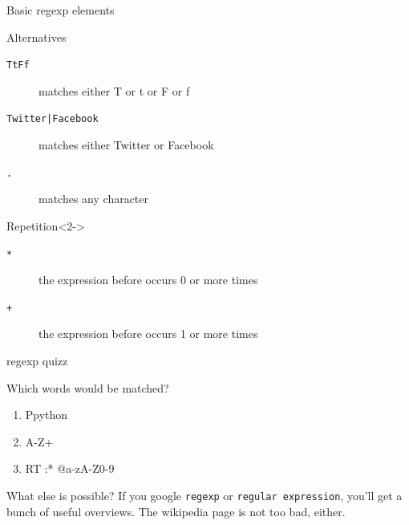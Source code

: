 \documentclass{beamer}
\begin{document}
\begin{frame}{Basic regexp elements}
\begin{block}{Alternatives}
\begin{description}
\item[{\tt{\lbrack TtFf\rbrack}}] matches either T or t or F or f
\item[{\tt{Twitter|Facebook}}] matches either Twitter or Facebook
\item[{\tt{.}}] matches any character
\end{description}
\end{block}
\begin{block}{Repetition}<2->
\begin{description}
\item[{\tt{*}}] the expression before occurs 0 or more times
\item[{\tt{+}}] the expression before occurs 1 or more times
\end{description}
\end{block}
\end{frame}

\begin{frame}{regexp quizz}
\begin{block}{Which words would be matched?}
\tt
\begin{enumerate}
\item<1-> \lbrack Pp\rbrack ython
\item<2-> \lbrack A-Z\rbrack +
\item<3-> RT :* @\lbrack a-zA-Z0-9\rbrack *
\end{enumerate}
\end{block}
\end{frame}

\begin{frame}{What else is possible?}
If you google {\tt{regexp}} or {\tt{regular expression}}, you'll get a bunch of useful overviews. The wikipedia page is not too bad, either. 
\end{frame}
\end{document}

